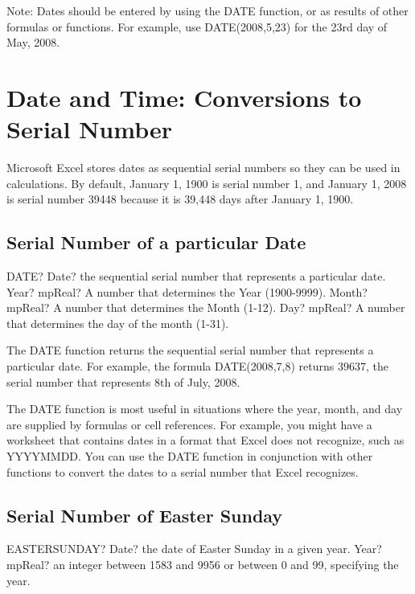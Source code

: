 Note: Dates should be entered by using the DATE function, or as results of other formulas or functions. For example, use DATE(2008,5,23) for the 23rd day of May, 2008.




\newpage
\section{Date and Time: Conversions to Serial Number}
Microsoft Excel stores dates as sequential serial numbers so they can be used in calculations. By default, January 1, 1900 is serial number 1, and January 1, 2008 is serial number 39448 because it is 39,448 days after January 1, 1900.


\subsection{Serial Number of a particular Date}

\begin{mpFunctionsExtract}
	\mpWorksheetFunctionThreeNotImplemented
	{DATE? Date? the sequential serial number that represents a particular date.}
	{Year? mpReal? A number that determines the Year (1900-9999).}
	{Month? mpReal? A number that determines the Month (1-12).}
	{Day? mpReal? A number that determines the day of the month (1-31).}
\end{mpFunctionsExtract}

\vspace{0.3cm}
The DATE function returns the sequential serial number that represents a particular date. For example, the formula DATE(2008,7,8) returns 39637, the serial number that represents 8th of July, 2008.

The DATE function is most useful in situations where the year, month, and day are supplied by formulas or cell references. For example, you might have a worksheet that contains dates in a format that Excel does not recognize, such as YYYYMMDD. You can use the DATE function in conjunction with other functions to convert the dates to a serial number that Excel recognizes.





\subsection{Serial Number of Easter Sunday}

\begin{mpFunctionsExtract}
	\mpWorksheetFunctionOneNotImplemented
	{EASTERSUNDAY? Date? the date of Easter Sunday in a given year.}
	{Year? mpReal? an integer between 1583 and 9956 or between 0 and 99, specifying the year. }
\end{mpFunctionsExtract}

